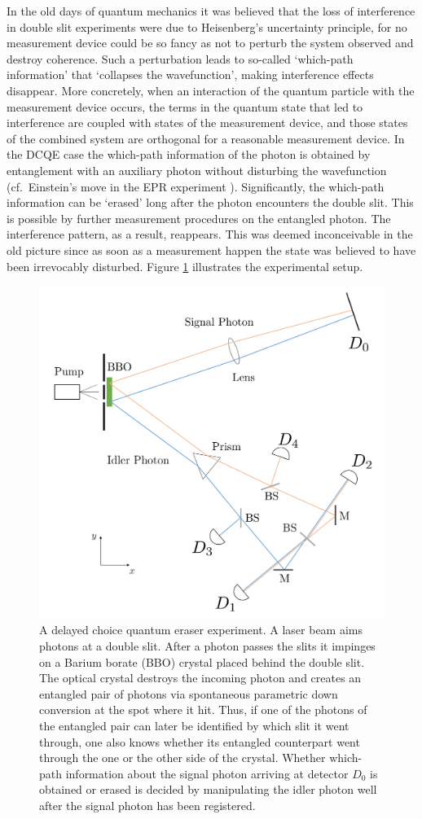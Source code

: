 \documentclass[11pt]{article}
\numberwithin{equation}{section}
\begin{document}
In the old days of quantum mechanics it was believed that the loss of interference in double slit experiments were due to Heisenberg's uncertainty principle, for no measurement device could be so fancy as not to perturb the system observed and destroy coherence. Such a perturbation leads to so-called `which-path information' that `collapses the wavefunction', making interference effects disappear. More concretely, when an interaction of the quantum particle with the measurement device occurs, the terms in the quantum state that led to interference are coupled with states of the measurement device, and those states of the combined system are orthogonal for a reasonable measurement device. In the DCQE case the which-path information of the photon is obtained by entanglement with an auxiliary photon without disturbing the wavefunction (cf.~Einstein's move in the EPR experiment \cite[p. 779]{PhysRev.47.777}). Significantly, the which-path information can be `erased' long after the photon encounters the double slit. This is possible by further measurement procedures on the entangled photon. The interference pattern, as a result, reappears.  This was deemed inconceivable in the old picture since as soon as a measurement happen the state was believed to have been irrevocably disturbed. Figure \ref{fig:Kim} illustrates the experimental setup. 
\begin{figure}[H]
\centering
\includegraphics[width=0.8\linewidth]{./DCQE.pdf}
\caption[]{A delayed choice quantum eraser experiment. A laser beam aims photons at a double slit. After a photon passes the slits it impinges on a Barium borate (BBO) crystal placed behind the double slit. The optical crystal destroys the incoming photon and creates an entangled pair of photons  via spontaneous parametric down conversion at the spot where it hit. Thus, if one of the photons of the entangled pair can later be identified by which slit it went through, one also knows whether its entangled counterpart went through the one or the other side of the crystal. Whether which-path information about the signal photon arriving at detector $D_0$ is obtained or erased is decided by manipulating the idler photon well after the signal photon has been registered.}
\label{fig:Kim}
\end{figure}
\end{document}
